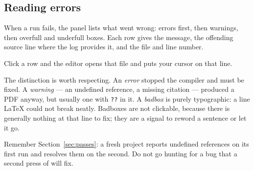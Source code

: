 \subsection{Reading errors}

When a run fails, the  panel lists what went wrong: errors first,
then warnings, then overfull and underfull boxes. Each row gives the message,
the offending source line where the log provides it, and the file and line
number.

Click a row and the editor opens that file and puts your cursor on that line.

The distinction is worth respecting. An \emph{error} stopped the compiler and
must be fixed. A \emph{warning} --- an undefined reference, a missing citation
--- produced a PDF anyway, but usually one with \texttt{??} in it. A
\emph{badbox} is purely typographic: a line \LaTeX{} could not break neatly.
Badboxes are not clickable, because there is generally nothing at that line to
fix; they are a signal to reword a sentence or let it go.

Remember Section~\ref{sec:passes}: a fresh project reports undefined references
on its first run and resolves them on the second. Do not go hunting for a bug
that a second press of  will fix.
